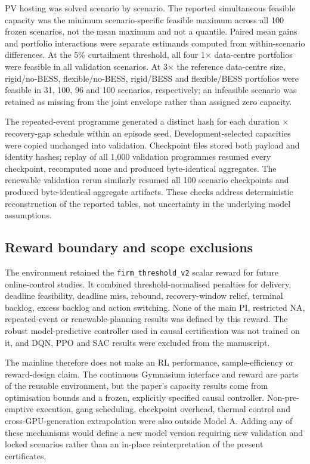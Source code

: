 \documentclass[10pt,a4paper]{article}
\begin{document}
PV hosting was solved scenario by scenario. The reported simultaneous feasible capacity was the minimum scenario-specific feasible maximum across all 100 frozen scenarios, not the mean maximum and not a quantile. Paired mean gains and portfolio interactions were separate estimands computed from within-scenario differences. At the 5\% curtailment threshold, all four 1× data-centre portfolios were feasible in all validation scenarios. At 3× the reference data-centre size, rigid/no-BESS, flexible/no-BESS, rigid/BESS and flexible/BESS portfolios were feasible in 31, 100, 96 and 100 scenarios, respectively; an infeasible scenario was retained as missing from the joint envelope rather than assigned zero capacity.


The repeated-event programme generated a distinct hash for each duration × recovery-gap schedule within an episode seed. Development-selected capacities were copied unchanged into validation. Checkpoint files stored both payload and identity hashes; replay of all 1,000 validation programmes resumed every checkpoint, recomputed none and produced byte-identical aggregates. The renewable validation rerun similarly resumed all 100 scenario checkpoints and produced byte-identical aggregate artifacts. These checks address deterministic reconstruction of the reported tables, not uncertainty in the underlying model assumptions.


\subsection{Reward boundary and scope exclusions}

The environment retained the \nolinkurl{firm_threshold_v2} scalar reward for future online-control studies. It combined threshold-normalised penalties for delivery, deadline feasibility, deadline miss, rebound, recovery-window relief, terminal backlog, excess backlog and action switching. None of the main PI, restricted NA, repeated-event or renewable-planning results was defined by this reward. The robust model-predictive controller used in causal certification was not trained on it, and DQN, PPO and SAC results were excluded from the manuscript.


The mainline therefore does not make an RL performance, sample-efficiency or reward-design claim. The continuous Gymnasium interface and reward are parts of the reusable environment, but the paper's capacity results come from optimisation bounds and a frozen, explicitly specified causal controller. Non-pre-emptive execution, gang scheduling, checkpoint overhead, thermal control and cross-GPU-generation extrapolation were also outside Model A. Adding any of these mechanisms would define a new model version requiring new validation and locked scenarios rather than an in-place reinterpretation of the present certificates.
\end{document}

